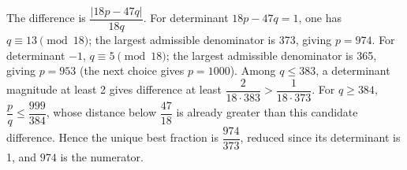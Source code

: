 The difference is $\dfrac{|18p-47q|}{18q}$. For determinant $18p-47q=1$, one has $q\equiv13\pmod{18}$; the largest admissible denominator is 373, giving $p=974$. For determinant $-1$, $q\equiv5\pmod{18}$; the largest admissible denominator is 365, giving $p=953$ (the next choice gives $p=1000$). Among $q\le383$, a determinant magnitude at least 2 gives difference at least $\dfrac{2}{18\cdot383}>\dfrac{1}{18\cdot373}$. For $q\ge384$, $\dfrac{p}{q}\le\dfrac{999}{384}$, whose distance below $\dfrac{47}{18}$ is already greater than this candidate difference. Hence the unique best fraction is $\dfrac{974}{373}$, reduced since its determinant is 1, and $\boxed{974}$ is the numerator.
